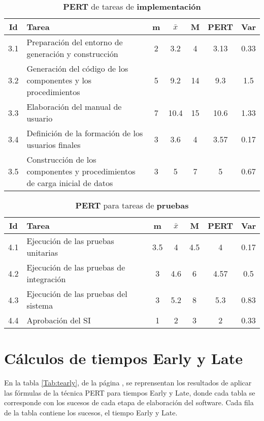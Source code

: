 \documentclass[11pt,a4paper,spanish,twoside]{report}
\begin{document}
\begin{table}[!h]
\centering
  \begin{tabular}{|c||p{5.3cm}||c|c|c||c|c|}
    \hline
    \textbf{Id} & \textbf{Tarea} & \textbf{m} & 
    \textbf{$\bar{x}$} &\textbf{M} & \textbf{PERT} & \textbf{Var}\\
    \hline \hline
    3.1 & Preparación del entorno de generación y construcción & 2 & 3.2  & 4
    & 3.13 & 0.33\\
    \hline
    3.2 & Generación del código de los componentes y los procedimientos & 5 &
    9.2 & 14 & 9.3 & 1.5\\
    \hline
    3.3 & Elaboración del manual de usuario & 7 & 10.4 & 15 & 10.6 & 1.33\\
    \hline
    3.4 & Definición de la formación de los usuarios finales & 3 & 3.6 & 4
    &3.57 & 0.17\\
    \hline
    3.5 & Construcción de los componentes y procedimientos de carga inicial
    de datos & 3 & 5 & 7 & 5 & 0.67\\
    \hline
  \end{tabular}
  \caption{\textbf{PERT} de tareas de \textbf{implementación}}
  \label{Tab:PERTimp}
\end{table}

\begin{table}[!h]
\centering
  \begin{tabular}{|c||p{5.3cm}||c|c|c||c|c|}
    \hline
    \textbf{Id} & \textbf{Tarea} & \textbf{m} & 
    \textbf{$\bar{x}$} &\textbf{M} & \textbf{PERT} & \textbf{Var}\\
    \hline \hline
    4.1 & Ejecución de las pruebas unitarias & 3.5 & 4 & 4.5 & 4 & 0.17\\
    \hline
    4.2 & Ejecución de las pruebas de integración & 3 & 4.6 & 6 & 4.57 & 0.5\\
    \hline
    4.3 & Ejecución de las pruebas del sistema & 3 & 5.2 & 8 & 5.3 & 0.83\\
    \hline
    4.4 & Aprobación del SI & 1 & 2 & 3 & 2 & 0.33\\
    \hline
  \end{tabular}
  \caption{\textbf{PERT} para tareas de \textbf{pruebas}}
  \label{Tab:PERTpru}
\end{table}

\section{Cálculos de tiempos Early y Late}
En la tabla \ref{Tab:tearly}, de la página \pageref{Tab:tearly}, se
reprensentan los resultados de aplicar las
fórmulas de la técnica PERT para tiempos Early y Late, donde cada tabla se
corresponde con los sucesos de cada etapa de elaboración del software. Cada
fila de la tabla contiene los sucesos, el tiempo Early y Late.
\end{document}
